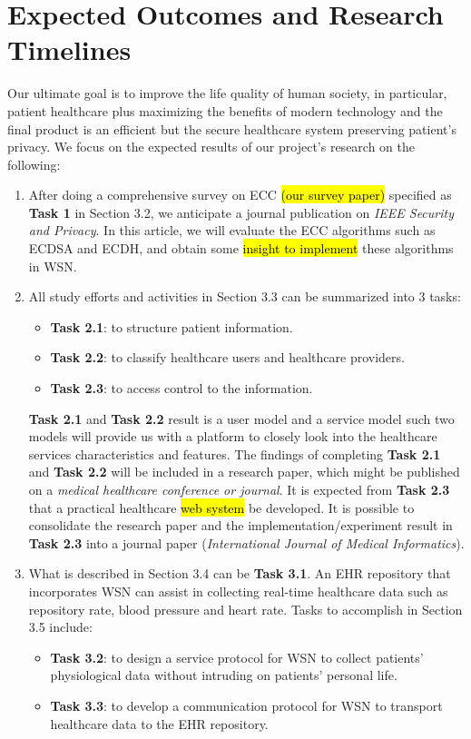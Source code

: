 \documentclass[a4paper,11pt]{article}
\DeclareRobustCommand{\hlyellow}[1]{{\sethlcolor{white}\hl{#1}}}
\begin{document}
\section{Expected Outcomes and Research Timelines}
Our ultimate goal is to improve the life quality of human society, in particular, patient healthcare plus maximizing the benefits of modern technology and the final product is an efficient but the secure healthcare system preserving patient's privacy. We focus on the expected results of our project's research on the following:
\begin{enumerate}
\item After doing a comprehensive survey on ECC \hlyellow{(our survey paper)} specified as \textbf{Task 1} in Section 3.2, we anticipate a journal publication on \emph{IEEE Security and Privacy}. In this article, we will evaluate the ECC algorithms such as ECDSA and ECDH, and obtain some \hlyellow{insight to implement} these algorithms in WSN.

\item All study efforts and activities in Section 3.3 can be summarized into 3 tasks:
     \begin{itemize}
           \item \textbf{Task 2.1}: to structure patient information.  
           \item \textbf{Task 2.2}: to classify healthcare users and healthcare providers.
           \item \textbf{Task 2.3}: to access control to the information.
     \end{itemize}
     \textbf{Task 2.1} and \textbf{Task 2.2} result is a user model and a service model such two models will provide us with a platform to closely look into the healthcare services characteristics and features. The findings of completing \textbf{Task 2.1} and \textbf{Task 2.2} will be included in a research paper, which might be published on a \emph{medical healthcare conference or journal}. It is expected from \textbf{Task 2.3} that a practical healthcare \hlyellow{web system} be developed. It is possible to consolidate the research paper and the implementation/experiment result in \textbf{Task 2.3} into a journal paper (\emph{International Journal of Medical Informatics}).
     
\item What is described in Section 3.4 can be \textbf{Task 3.1}. An EHR repository that incorporates WSN can assist in collecting real-time healthcare data such as repository rate, blood pressure and heart rate. Tasks to accomplish in Section 3.5 include:
\begin{itemize}
           \item \textbf{Task 3.2}: to design a service protocol for WSN to collect patients' physiological data without intruding on patients' personal life.  
           \item \textbf{Task 3.3}: to develop a communication protocol for WSN to transport healthcare data to the EHR repository.      
     \end{itemize}


\end{enumerate}
\end{document}
